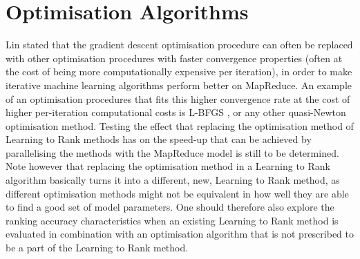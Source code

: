 \section{Optimisation Algorithms}
Lin \cite{Lin2013} stated that the gradient descent optimisation procedure can often be replaced with other optimisation procedures with faster convergence properties (often at the cost of being more computationally expensive per iteration), in order to make iterative machine learning algorithms perform better on MapReduce. An example of an optimisation procedures that fits this higher convergence rate at the cost of higher per-iteration computational costs is L-BFGS \cite{Liu1989}, or any other quasi-Newton optimisation method. Testing the effect that replacing the optimisation method of Learning to Rank methods has on the speed-up that can be achieved by parallelising the methods with the MapReduce model is still to be determined. Note however that replacing the optimisation method in a Learning to Rank algorithm basically turns it into a different, new, Learning to Rank method, as different optimisation methods might not be equivalent in how well they are able to find a good set of model parameters. One should therefore also explore the ranking accuracy characteristics when an existing Learning to Rank method is evaluated in combination with an optimisation algorithm that is not prescribed to be a part of the Learning to Rank method.